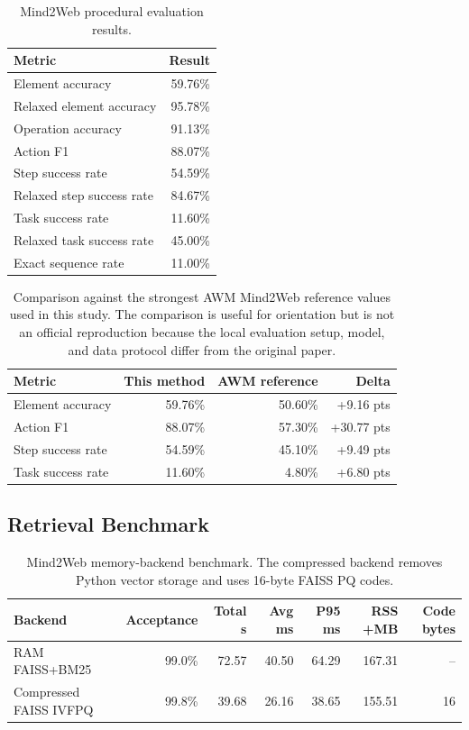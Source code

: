 \documentclass[11pt]{article}
\begin{document}
\begin{table}[h]
\centering
\small
\begin{tabular}{lr}
\toprule
\textbf{Metric} & \textbf{Result} \\
\midrule
Element accuracy & 59.76\% \\
Relaxed element accuracy & 95.78\% \\
Operation accuracy & 91.13\% \\
Action F1 & 88.07\% \\
Step success rate & 54.59\% \\
Relaxed step success rate & 84.67\% \\
Task success rate & 11.60\% \\
Relaxed task success rate & 45.00\% \\
Exact sequence rate & 11.00\% \\
\bottomrule
\end{tabular}
\caption{Mind2Web procedural evaluation results.}
\label{tab:mind2web_accuracy}
\end{table}

\begin{table}[h]
\centering
\small
\begin{tabular}{lrrr}
\toprule
\textbf{Metric} & \textbf{This method} & \textbf{AWM reference} & \textbf{Delta} \\
\midrule
Element accuracy & 59.76\% & 50.60\% & +9.16 pts \\
Action F1 & 88.07\% & 57.30\% & +30.77 pts \\
Step success rate & 54.59\% & 45.10\% & +9.49 pts \\
Task success rate & 11.60\% & 4.80\% & +6.80 pts \\
\bottomrule
\end{tabular}
\caption{Comparison against the strongest AWM Mind2Web reference values used in this study. The comparison is useful for orientation but is not an official reproduction because the local evaluation setup, model, and data protocol differ from the original paper.}
\label{tab:mind2web_paper_comparison}
\end{table}

\subsection{Retrieval Benchmark}

\begin{table}[h]
\centering
\small
\begin{tabular}{lrrrrrr}
\toprule
\textbf{Backend} & \textbf{Acceptance} & \textbf{Total s} & \textbf{Avg ms} & \textbf{P95 ms} & \textbf{RSS +MB} & \textbf{Code bytes} \\
\midrule
RAM FAISS+BM25 & 99.0\% & 72.57 & 40.50 & 64.29 & 167.31 & -- \\
Compressed FAISS IVFPQ & 99.8\% & 39.68 & 26.16 & 38.65 & 155.51 & 16 \\
\bottomrule
\end{tabular}
\caption{Mind2Web memory-backend benchmark. The compressed backend removes Python vector storage and uses 16-byte FAISS PQ codes.}
\label{tab:mind2web_retrieval}
\end{table}
\end{document}

